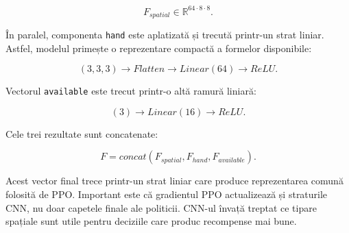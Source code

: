 \documentclass[12pt,a4paper]{article}
\begin{document}
\begin{equation}
    F_{spatial} \in \mathbb{R}^{64 \cdot 8 \cdot 8}.
\end{equation}

În paralel, componenta \texttt{hand} este aplatizată și trecută printr-un strat liniar. Astfel, modelul primește o reprezentare compactă a formelor disponibile:

\begin{equation}
    (3,3,3) \rightarrow Flatten \rightarrow Linear(64) \rightarrow ReLU.
\end{equation}

Vectorul \texttt{available} este trecut printr-o altă ramură liniară:

\begin{equation}
    (3) \rightarrow Linear(16) \rightarrow ReLU.
\end{equation}

Cele trei rezultate sunt concatenate:

\begin{equation}
    F = concat(F_{spatial}, F_{hand}, F_{available}).
\end{equation}

Acest vector final trece printr-un strat liniar care produce reprezentarea comună folosită de PPO. Important este că gradientul PPO actualizează și straturile CNN, nu doar capetele finale ale politicii. CNN-ul învață treptat ce tipare spațiale sunt utile pentru deciziile care produc recompense mai bune.
\end{document}
